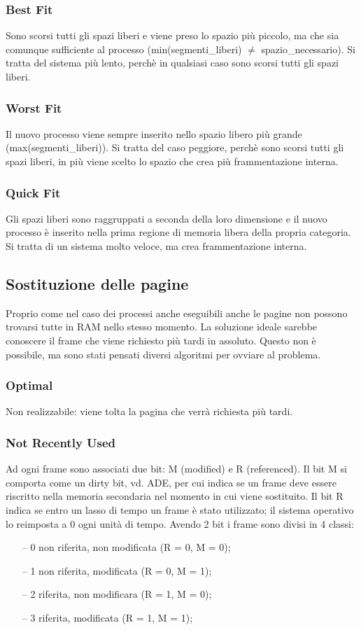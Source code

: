 \documentclass{article}
\begin{document}
\subsubsection{Best Fit} 
Sono scorsi tutti gli spazi liberi e viene preso lo spazio più piccolo, ma che sia comunque sufficiente al processo (min(segmenti\_liberi) $\neq$ spazio\_necessario). Si tratta del sistema più lento, perchè in qualsiasi caso sono scorsi tutti gli spazi liberi.

\subsubsection{Worst Fit}
Il nuovo processo viene sempre inserito nello spazio libero più grande (max(segmenti\_liberi)). Si tratta del caso peggiore, perchè sono scorsi tutti gli spazi liberi, in più viene scelto lo spazio che crea più frammentazione interna.

\subsubsection{Quick Fit} 
Gli spazi liberi sono raggruppati a seconda della loro dimensione e il nuovo processo è inserito nella prima regione di memoria libera della propria categoria. Si tratta di un sistema molto veloce, ma crea frammentazione interna.


\subsection{Sostituzione delle pagine}
Proprio come nel caso dei processi anche eseguibili anche le pagine non possono trovarsi tutte in RAM nello stesso momento. La soluzione ideale sarebbe conoscere il frame che viene richiesto più tardi in assoluto. Questo non è possibile, ma sono stati pensati diversi algoritmi per ovviare al problema. 

\subsubsection{Optimal}
Non realizzabile: viene tolta la pagina che verrà richiesta più tardi.

\subsubsection{Not Recently Used}
Ad ogni frame sono associati due bit: M (modified) e R (referenced). Il bit M si comporta come un dirty bit, vd. ADE, per cui indica se un frame deve essere riscritto nella memoria secondaria nel momento in cui viene sostituito. Il bit R indica se entro un lasso di tempo un frame è stato utilizzato; il sistema operativo lo reimposta a 0 ogni unità di tempo. Avendo 2 bit i frame sono divisi in 4 classi:
\begin{itemize}
	\item [--] 0 non riferita, non modificata (R = 0, M = 0);
	\item [--] 1 non riferita, modificata (R = 0, M = 1);
	\item [--] 2 riferita, non modificara (R = 1, M = 0);
	\item [--] 3 riferita, modificata (R = 1, M = 1);
\end{itemize}
\end{document}
